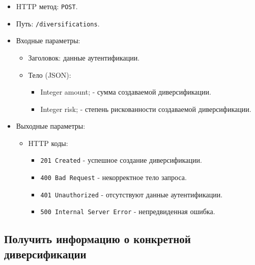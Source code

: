 \documentclass[a4paper, 14pt]{article}
\begin{document}
\begin{itemize}
    \item HTTP метод: \texttt{POST}.
    \item Путь: \texttt{/diversifications}.
    \item Входные параметры:
    \begin{itemize}
        \item Заголовок: данные аутентификации.
        \item Тело (JSON):
        \begin{itemize}
            \item Integer amount; - сумма создаваемой диверсификации.
            \item Integer risk; - степень рискованности создаваемой диверсификации.
        \end{itemize}
    \end{itemize}
    \item Выходные параметры:
    \begin{itemize}
        \item HTTP коды:
        \begin{itemize}
            \item \texttt{201 Created} - успешное создание диверсификации.
            \item \texttt{400 Bad Request} - некорректное тело запроса.
            \item \texttt{401 Unauthorized} - отсутствуют данные аутентификации.
            \item \texttt{500 Internal Server Error} - непредвиденная ошибка.
        \end{itemize}
    \end{itemize}
\end{itemize}

\subsection{Получить информацию о конкретной диверсификации}
\end{document}
